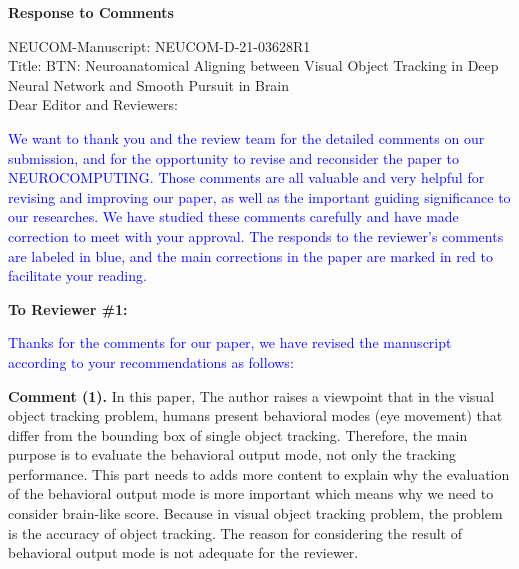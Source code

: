 \documentclass[12pt,journal,onecolumn]{IEEEtran}
\begin{document}
\begin{center}
	\textbf{\LARGE Response to Comments} 
\end{center}
\vspace{8pt} 

\noindent NEUCOM-Manuscript: NEUCOM-D-21-03628R1 \\

\noindent Title: BTN: Neuroanatomical Aligning between Visual Object Tracking in Deep Neural Network and Smooth Pursuit in Brain \\

\noindent Dear Editor and Reviewers:

\textcolor{blue}{
We want to thank you and the review team for the detailed comments on our submission, and for the opportunity to revise and reconsider the paper to NEUROCOMPUTING.  
Those comments are all valuable and very helpful for revising and improving our paper, as well as the important guiding significance to our researches. 
We have studied these comments carefully and have made correction to meet with your approval. 
The responds to the reviewer's comments are labeled in blue, 
and the main corrections in the paper are marked in red to facilitate your reading. 
}

\vspace{8pt} 

\newpage





\textbf{To Reviewer \#1:}

\textcolor{blue}{Thanks for the comments for our paper, we have revised the manuscript according to your recommendations as follows:}

\textbf{Comment (1).} In this paper, The author raises a viewpoint that in the visual object tracking problem, humans present behavioral modes (eye movement) that differ from the bounding box of single object tracking. 
Therefore, the main purpose is to evaluate the behavioral output mode, not only the tracking performance. 
This part needs to adds more content to explain why the evaluation of the behavioral output mode is more important which means why we need to consider brain-like score. 
Because in visual object tracking problem, the problem is the accuracy of object tracking. 
The reason for considering the result of behavioral output mode is not adequate for the reviewer.
\end{document}
